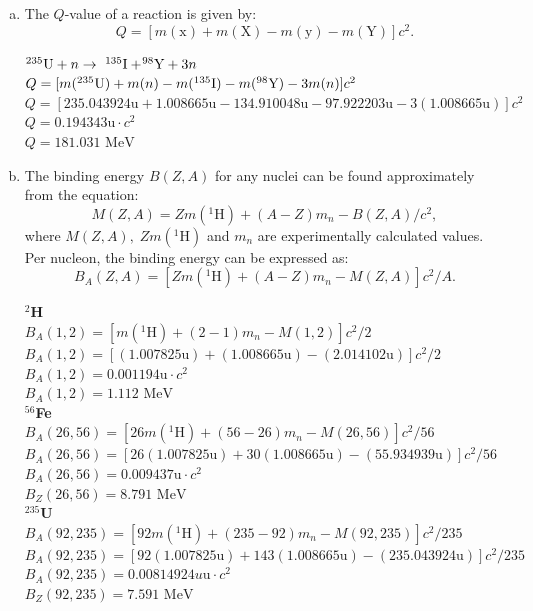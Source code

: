 \documentclass{report}
\newcommand{\tab}{\-\hspace{1.5cm}}
\begin{document}
\begin{enumerate}[a)]
\item The $Q$-value of a reaction is given by:$$Q=[m(\text{x})+m(\text{X})-m(\text{y})-m(\text{Y})]c^{2}.$$

\begin{spacing}{1.75}	
$^{235}\text{\normalfont{U}}+n \rightarrow  \-\ ^{135}\text{\normalfont{I}}+ \! ^{98}\text{\normalfont{Y}}+3n$\\
	\tab $Q = [m(^{235}\text{\normalfont{U}})+m(n)-m(^{135}\text{\normalfont{I}})-m(^{98}\text{\normalfont{Y}})-3m(n)]c^{2}$\\
	\tab $Q = [235.043924\text{u}+1.008665\text{u}-134.910048\text{u}-97.922203\text{u}-3(1.008665\text{u})]c^{2}$\\
	\tab $Q = 0.194343\text{u} \cdot c^{2}$\\
	\tab $\boxed{Q = 181.031 \text{ MeV}}$ 
\end{spacing}


\item The binding energy $B(Z,A)$ for any nuclei can be found approximately from the equation:$$M(Z,A) = Zm(^{1}\text{H})+(A-Z)m_{n}-B(Z,A)/c^{2},$$ where $M(Z,A),\; Zm(^{1}\text{H})$ and $m_{n}$ are experimentally calculated values. Per nucleon, the binding energy can be expressed as: $$B_{A}(Z,A) = [Zm(^{1}\text{H})+(A-Z)m_{n}-M(Z,A)]c^{2}/A.$$

\begin{spacing}{1.75}

\textbf{$^{2}$H}\\
$B_{A}(1,2) = [m(^{1}\text{H})+(2-1)m_{n}-M(1,2)]c^{2}/2$\\
$B_{A}(1,2) = [(1.007825\text{u})+(1.008665\text{u})-(2.014102\text{u})]c^{2}/2$\\
$B_{A}(1,2) = 0.001194\text{u} \cdot c^{2}$\\
$\boxed{B_{A}(1,2) = 1.112\text{ MeV}}$\\
\textbf{$^{56}$Fe}\\
$B_{A}(26,56) = [26m(^{1}\text{H})+(56-26)m_{n}-M(26,56)]c^{2}/56$\\
$B_{A}(26,56) = [26(1.007825\text{u})+30(1.008665\text{u})-(55.934939\text{u})]c^{2}/56$\\
$B_{A}(26,56) = 0.009437\text{u} \cdot c^{2}$\\
$\boxed{B_{Z}(26,56) = 8.791\text{ MeV}}$\\
\textbf{$^{235}$U}\\
$B_{A}(92,235) = [92m(^{1}\text{H})+(235-92)m_{n}-M(92,235)]c^{2}/235$\\
$B_{A}(92,235) = [92(1.007825\text{u})+143(1.008665\text{u})-(235.043924\text{u})]c^{2}/235$\\
$B_{A}(92,235) = 0.00814924 u\text{u} \cdot c^{2}$\\
$\boxed{B_{Z}(92,235) = 7.591\text{ MeV}}$
\end{spacing}
\end{enumerate}
\end{document}
